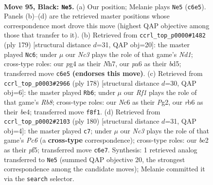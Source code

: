 \documentclass[11pt]{article}
\begin{document}
\clearpage

\begin{figure}[p]\centering
\begin{subfigure}{0.46\textwidth}\centering
\resizebox{\linewidth}{!}{%
\newchessgame
\chessboard[
  setfen={5r2/3k4/PRn5/8/6P1/4K2P/2P1B3/8 b - - 0 95},
  showmover=false,
  pgfstyle=straightmove, color=movearrow, markmove={c6-e5}
]}
\caption{}
\end{subfigure}\hfill
\begin{subfigure}{0.46\textwidth}\centering
\resizebox{\linewidth}{!}{%
\newchessgame
\chessboard[
  setfen={3n4/3R1P1n/5k2/2PB4/8/2P5/2K2P2/8 b - - 4 90},
  showmover=false,
  pgfstyle=straightmove, color=movearrow, markmove={d8-c6}
]}
\caption{}
\end{subfigure}
\\[4pt]
\begin{subfigure}{0.46\textwidth}\centering
\resizebox{\linewidth}{!}{%
\newchessgame
\chessboard[
  setfen={1R6/6k1/5p2/3p3p/4b2P/8/5KP1/8 w - - 19 90},
  showmover=false,
  pgfstyle=straightmove, color=movearrow, markmove={b8-b6}
]}
\caption{}
\end{subfigure}\hfill
\begin{subfigure}{0.46\textwidth}\centering
\resizebox{\linewidth}{!}{%
\newchessgame
\chessboard[
  setfen={4R3/8/2PK1k2/3p1p2/2r3p1/8/8/8 w - - 1 91},
  showmover=false,
  pgfstyle=straightmove, color=movearrow, markmove={c6-c7}
]}
\caption{}
\end{subfigure}
\caption{\textbf{Move 95, Black: \texttt{Ne5}.} (a) Our position; Melanie plays \texttt{Ne5} (\texttt{c6e5}). Panels (b)--(d) are the retrieved master positions whose correspondence most drove this move (highest QAP objective among those that transfer to it). (b) Retrieved from \texttt{ccrl\_top\_p0000\#1482} (ply 179) [structural distance $d$=31, QAP obj=20]: the master played \texttt{Nc6}; under $\mu$ our \emph{Nc3} plays the role of that game's \emph{Nd1}; cross-type roles: our \emph{p}g4 as their \emph{N}h7, our \emph{p}a6 as their \emph{b}d5; transferred move \texttt{c6e5} \textbf{(endorses this move)}. (c) Retrieved from \texttt{ccrl\_top\_p0003\#2966} (ply 178) [structural distance $d$=30, QAP obj=6]: the master played \texttt{Rb6}; under $\mu$ our \emph{Rf1} plays the role of that game's \emph{Rb8}; cross-type roles: our \emph{N}c6 as their \emph{P}g2, our \emph{r}b6 as their \emph{b}e4; transferred move \texttt{f8f1}. (d) Retrieved from \texttt{ccrl\_top\_p0002\#2103} (ply 180) [structural distance $d$=31, QAP obj=4]: the master played \texttt{c7}; under $\mu$ our \emph{Nc3} plays the role of that game's \emph{Pc6} (a \textbf{cross-type} correspondence); cross-type roles: our \emph{b}e2 as their \emph{p}f5; transferred move \texttt{c6e7}. Synthesis: 1 retrieved analog transferred to \texttt{Ne5} (summed QAP objective 20, the strongest correspondence among the candidate moves); Melanie committed it via the \texttt{search} selector.}
\label{fig:thought-m189}
\end{figure}
\end{document}
